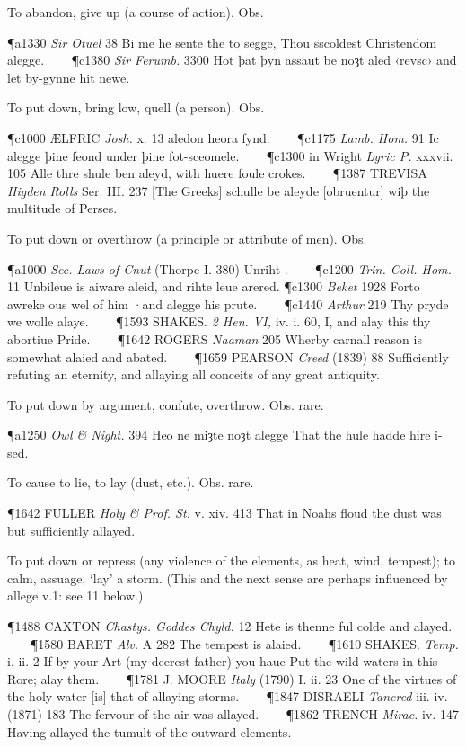 \begin{description}[wide, labelwidth=!, labelindent=0pt]
\begin{myenumerate}
 To abandon, give up (a course of action). Obs. 

\P a1330 \textit{Sir Otuel} 38 Bi me he sente the to segge, Thou sscoldest Christendom alegge.    
\P c1380 \textit{Sir Ferumb.} 3300 Hot þat þyn assaut be noȝt aled ‹revsc› and let by-gynne hit newe.

 To put down, bring low, quell (a person). Obs. 

\P c1000 ÆLFRIC \textit{Josh.} x. 13  aledon heora fynd.    
\P c1175 \textit{Lamb. Hom.} 91 Ic alegge þine feond under þine fot-sceomele.    
\P c1300 in Wright \textit{Lyric P.} xxxvii. 105 Alle thre shule ben aleyd, with huere foule crokes.    
\P 1387 TREVISA \textit{Higden Rolls} Ser. III. 237 [The Greeks] schulle be aleyde [obruentur] wiþ the multitude of Perses.

 To put down or overthrow (a principle or attribute of men). Obs. 

\P a1000 \textit{Sec. Laws of Cnut} (Thorpe I. 380) Unriht .    
\P c1200 \textit{Trin. Coll. Hom.} 11 Unbileue is aiware aleid, and rihte leue arered.
\P c1300 \textit{Beket} 1928 Forto awreke ous wel of him ·and alegge his prute.    
\P c1440 \textit{Arthur} 219 Thy pryde we wolle alaye.    
\P 1593 SHAKES. \textit{2 Hen. VI,} iv. i. 60, I, and alay this thy abortiue Pride.    
\P 1642 ROGERS \textit{Naaman} 205 Wherby carnall reason is somewhat alaied and abated.    
\P 1659 PEARSON \textit{Creed} (1839) 88 Sufficiently refuting an eternity, and allaying all conceits of any great antiquity.

 To put down by argument, confute, overthrow. Obs. rare. 

\P a1250 \textit{Owl \& Night.} 394 Heo ne miȝte noȝt alegge That the hule hadde hire i-sed.

 To cause to lie, to lay (dust, etc.). Obs. rare. 

\P 1642 FULLER \textit{Holy \& Prof. St.} v. xiv. 413 That in Noahs floud the dust was but sufficiently allayed.

 To put down or repress (any violence of the elements, as heat, wind, tempest); to calm, assuage, ‘lay’ a storm. (This and the next sense are perhaps influenced by allege v.1: see 11 below.) 

\P 1488 CAXTON \textit{Chastys. Goddes Chyld.} 12 Hete is thenne ful colde and alayed.    
\P 1580 BARET \textit{Alv.} A 282 The tempest is alaied.    
\P 1610 SHAKES. \textit{Temp.} i. ii. 2 If by your Art (my deerest father) you haue Put the wild waters in this Rore; alay them.    
\P 1781 J. MOORE \textit{Italy} (1790) I. ii. 23 One of the virtues of the holy water [is] that of allaying storms.    
\P 1847 DISRAELI \textit{Tancred} iii. iv. (1871) 183 The fervour of the air was allayed.    
\P 1862 TRENCH \textit{Mirac.} iv. 147 Having allayed the tumult of the outward elements.


\end{myenumerate}
\end{description}
